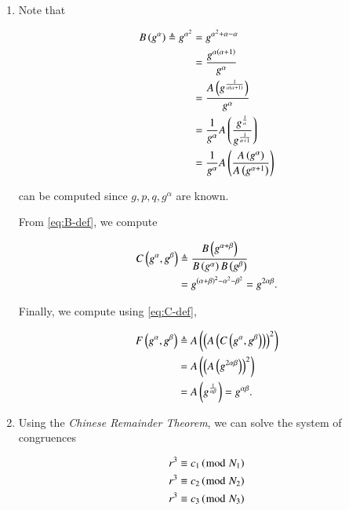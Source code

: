 \documentclass[journal,12pt,twocolumn]{IEEEtran}
\begin{document}
\begin{enumerate}
    \item Note that
    
    \begin{align}
        B\left(g^\alpha\right) \triangleq g^{\alpha^2} &= g^{\alpha^2 + \alpha - \alpha} \\
                                                 &= \frac{g^{\alpha\left(\alpha+1\right)}}{g^\alpha} \\
                                                 &= \frac{A\left(g^{\frac{1}{\alpha\left(\alpha+1\right)}}\right)}{g^\alpha} \\
                                                 &= \frac{1}{g^\alpha}A\left(\frac{g^{\frac{1}{\alpha}}}{g^{\frac{1}{\alpha+1}}}\right) \\
                                                 &= \frac{1}{g^\alpha}A\left(\frac{A\left(g^\alpha\right)}{A\left(g^{\alpha+1}\right)}\right)
                                                 \label{eq:B-def}
    \end{align}
    
    can be computed since \(g, p, q, g^\alpha\) are known.

    From \eqref{eq:B-def}, we compute

    \begin{align}
        C\left(g^\alpha, g^\beta\right) &\triangleq \frac{B\left(g^{\alpha+\beta}\right)}{B\left(g^\alpha\right)B\left(g^\beta\right)} \\
                                  &= g^{\left(\alpha+\beta\right)^2-\alpha^2-\beta^2} = g^{2\alpha\beta}.
                                  \label{eq:C-def}
    \end{align}

    Finally, we compute using \eqref{eq:C-def},

    \begin{align}
        F\left(g^\alpha, g^\beta\right) &\triangleq A\left(\left(A\left(C\left(g^\alpha,g^\beta\right)\right)\right)^2\right) \\
                                  &= A\left(\left(A\left(g^{2\alpha\beta}\right)\right)^2\right) \\
                                  &= A\left(g^{\frac{1}{\alpha\beta}}\right) = g^{\alpha\beta}.
                                  \label{eq:F-sol}
    \end{align}

    \item Using the \emph{Chinese Remainder Theorem}, we can solve the system of
    congruences

    \begin{align}
        r^3 &\equiv c_1 \left(\bmod\ N_1\right) \\
        r^3 &\equiv c_2 \left(\bmod\ N_2\right) \\
        r^3 &\equiv c_3 \left(\bmod\ N_3\right)
        \label{eq:crt-equiv}
    \end{align}


\end{enumerate}
\end{document}
